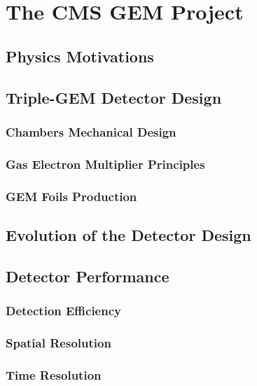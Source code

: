 \chapter{The CMS GEM Project}
\label{chap:gem}

    \section{Physics Motivations}

    \section{Triple-GEM Detector Design}

        \subsection{Chambers Mechanical Design}

        \subsection{Gas Electron Multiplier Principles}

        \subsection{GEM Foils Production}

        \section{Evolution of the Detector Design}

    \section{Detector Performance}

        \subsection{Detection Efficiency}

        \subsection{Spatial Resolution}

        \subsection{Time Resolution}

